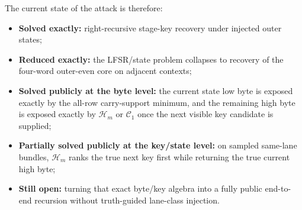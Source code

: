 \documentclass[11pt]{article}
\begin{document}
The current state of the attack is therefore:
\begin{itemize}
\item \textbf{Solved exactly:} right-recursive stage-key recovery under injected outer states;
\item \textbf{Reduced exactly:} the LFSR/state problem collapses to recovery of the four-word outer-even core on adjacent contexts;
\item \textbf{Solved publicly at the byte level:} the current state low byte is exposed exactly by the all-row carry-support minimum, and the remaining high byte is exposed exactly by $\mathcal{H}_m$ or $\mathcal{C}_1$ once the next visible key candidate is supplied;
\item \textbf{Partially solved publicly at the key/state level:} on sampled same-lane bundles, $\mathcal{H}_m$ ranks the true next key first while returning the true current high byte;
\item \textbf{Still open:} turning that exact byte/key algebra into a fully public end-to-end recursion without truth-guided lane-class injection.
\end{itemize}
\end{document}
